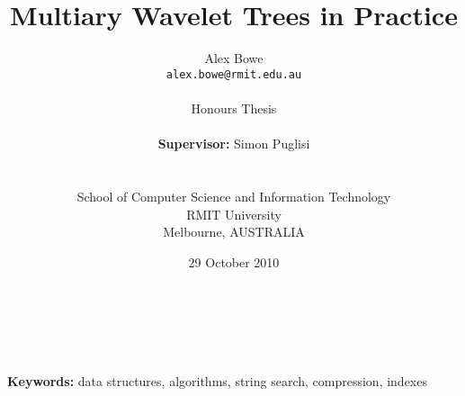 \documentclass[a4paper]{article}
\begin{document}
\title{Multiary Wavelet Trees in Practice}
\author{Alex Bowe\\
\texttt{alex.bowe@rmit.edu.au} \\ \\
Honours Thesis \\ \\
\textbf{Supervisor:} Simon Puglisi\\ \\ \\
School of Computer Science and Information Technology \\
RMIT University\\
Melbourne, AUSTRALIA}

\date{29 October 2010}

\maketitle

\begin{abstract}
 \\ \\
\end{abstract}

\textbf{Keywords:} data structures, algorithms, string search, compression, indexes

%

\newpage
\tableofcontents
\newpage





%







\appendix




\end{document}
